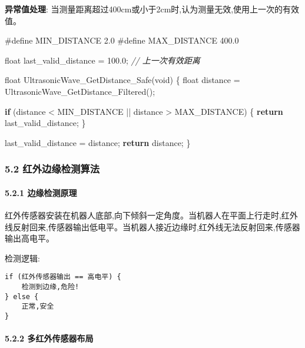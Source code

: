 \documentclass[
]{article}
\newenvironment{Shaded}{}{}
\newcommand{\CommentTok}[1]{\textcolor[rgb]{0.38,0.63,0.69}{\textit{#1}}}
\newcommand{\ControlFlowTok}[1]{\textcolor[rgb]{0.00,0.44,0.13}{\textbf{#1}}}
\newcommand{\DataTypeTok}[1]{\textcolor[rgb]{0.56,0.13,0.00}{#1}}
\newcommand{\FloatTok}[1]{\textcolor[rgb]{0.25,0.63,0.44}{#1}}
\newcommand{\NormalTok}[1]{#1}
\newcommand{\PreprocessorTok}[1]{\textcolor[rgb]{0.74,0.48,0.00}{#1}}
\begin{document}
\textbf{异常值处理}:
当测量距离超过400cm或小于2cm时,认为测量无效,使用上一次的有效值。

\begin{Shaded}
\begin{Highlighting}[]
\PreprocessorTok{\#define MIN\_DISTANCE 2.0}
\PreprocessorTok{\#define MAX\_DISTANCE 400.0}

\DataTypeTok{float}\NormalTok{ last\_valid\_distance = }\FloatTok{100.0}\NormalTok{;  }\CommentTok{// 上一次有效距离}

\DataTypeTok{float}\NormalTok{ UltrasonicWave\_GetDistance\_Safe(}\DataTypeTok{void}\NormalTok{)}
\NormalTok{\{}
    \DataTypeTok{float}\NormalTok{ distance = UltrasonicWave\_GetDistance\_Filtered();}
    
    \ControlFlowTok{if}\NormalTok{ (distance \textless{} MIN\_DISTANCE || distance \textgreater{} MAX\_DISTANCE) \{}
        \ControlFlowTok{return}\NormalTok{ last\_valid\_distance;}
\NormalTok{    \}}
    
\NormalTok{    last\_valid\_distance = distance;}
    \ControlFlowTok{return}\NormalTok{ distance;}
\NormalTok{\}}
\end{Highlighting}
\end{Shaded}

\hypertarget{ux7ea2ux5916ux8fb9ux7f18ux68c0ux6d4bux7b97ux6cd5}{%
\subsubsection{5.2
红外边缘检测算法}\label{ux7ea2ux5916ux8fb9ux7f18ux68c0ux6d4bux7b97ux6cd5}}

\hypertarget{ux8fb9ux7f18ux68c0ux6d4bux539fux7406}{%
\paragraph{5.2.1
边缘检测原理}\label{ux8fb9ux7f18ux68c0ux6d4bux539fux7406}}

红外传感器安装在机器人底部,向下倾斜一定角度。当机器人在平面上行走时,红外线反射回来,传感器输出低电平。当机器人接近边缘时,红外线无法反射回来,传感器输出高电平。

检测逻辑:

\begin{verbatim}
if (红外传感器输出 == 高电平) {
    检测到边缘,危险!
} else {
    正常,安全
}
\end{verbatim}

\hypertarget{ux591aux7ea2ux5916ux4f20ux611fux5668ux5e03ux5c40}{%
\paragraph{5.2.2
多红外传感器布局}\label{ux591aux7ea2ux5916ux4f20ux611fux5668ux5e03ux5c40}}
\end{document}
